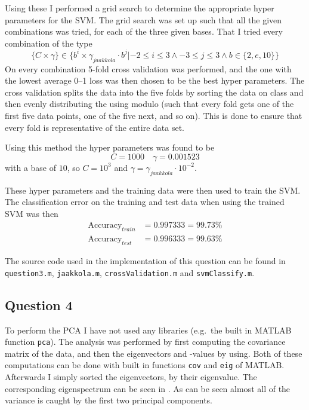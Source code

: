 \documentclass[a4paper, 11pt]{article}
\begin{document}
Using these I performed a grid search to determine the appropriate hyper parameters for the SVM\@. The grid search was set up such that all the given combinations was tried, for each of the three given bases. That I tried every combination of the type
\[
    \lbrace C \times \gamma \rbrace \in \lbrace b^i \times \gamma_{\mathit{jaakkola}} \cdot b^j | -2 \le i \le 3 \wedge -3 \le j \le 3 \wedge b \in \lbrace 2, e, 10 \rbrace \rbrace
\]
On every combination 5-fold cross validation was performed, and the one with the lowest average 0--1 loss was then chosen to be the best hyper parameters. The cross validation splits the data into the five folds by sorting the data on class and then evenly distributing the using modulo (such that every fold gets one of the first five data points, one of the five next, and so on). This is done to ensure that every fold is representative of the entire data set.

Using this method the hyper parameters was found to be
\[
    C = 1000 \quad \gamma = 0.001523
\]
with a base of $10$, so $C = 10^3$ and $\gamma = \gamma_{\mathit{jaakkola}} \cdot 10^{-2}$.

These hyper parameters and the training data were then used to train the SVM\@. The classification error on the training and test data when using the trained SVM was then
\begin{align*}
    \mathrm{Accuracy}_{\mathit{train}} &= 0.997333 = 99.73 \% \\
    \mathrm{Accuracy}_{\mathit{test}} &= 0.996333 = 99.63 \%
\end{align*}

The source code used in the implementation of this question can be found in \texttt{question3.m}, \texttt{jaakkola.m}, \texttt{crossValidation.m} and \texttt{svmClassify.m}.

\subsection*{Question 4}
To perform the PCA I have not used any libraries (e.g.\ the built in MATLAB function \texttt{pca}). The analysis was performed by first computing the covariance matrix of the data, and then the eigenvectors and -values by using. Both of these computations can be done with built in functions \texttt{cov} and \texttt{eig} of MATLAB\@. Afterwards I simply sorted the eigenvectors, by their eigenvalue. The corresponding eigenspectrum can be seen in . As can be seen almost all of the variance is caught by the first two principal components. 
\end{document}
